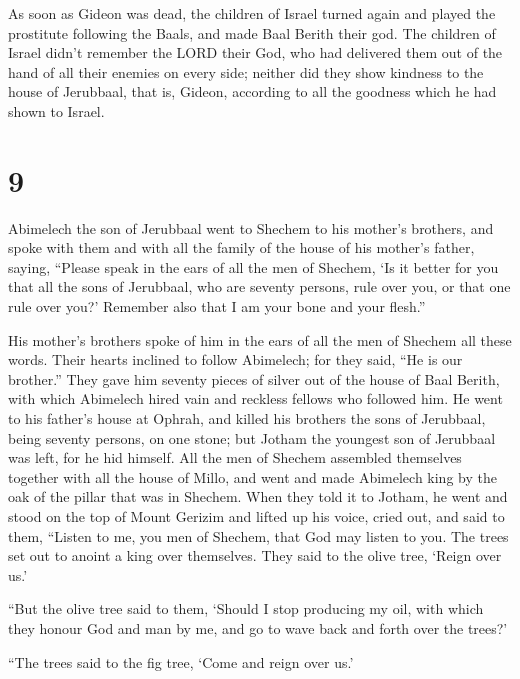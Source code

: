  As soon as Gideon was dead, the children of Israel
turned again and played the prostitute following the Baals, and made
Baal Berith their god.  The children of Israel didn't
remember the LORD their God, who had delivered them out of the hand of
all their enemies on every side;  neither did they show
kindness to the house of Jerubbaal, that is, Gideon, according to all
the goodness which he had shown to Israel.

\hypertarget{section-8}{%
\section{9}\label{section-8}}

 Abimelech the son of Jerubbaal went to Shechem to his
mother's brothers, and spoke with them and with all the family of the
house of his mother's father, saying,  ``Please speak in
the ears of all the men of Shechem, `Is it better for you that all the
sons of Jerubbaal, who are seventy persons, rule over you, or that one
rule over you?' Remember also that I am your bone and your flesh.''

 His mother's brothers spoke of him in the ears of all the
men of Shechem all these words. Their hearts inclined to follow
Abimelech; for they said, ``He is our brother.''  They
gave him seventy pieces of silver out of the house of Baal Berith, with
which Abimelech hired vain and reckless fellows who followed him.
 He went to his father's house at Ophrah, and killed his
brothers the sons of Jerubbaal, being seventy persons, on one stone; but
Jotham the youngest son of Jerubbaal was left, for he hid himself.
 All the men of Shechem assembled themselves together with
all the house of Millo, and went and made Abimelech king by the oak of
the pillar that was in Shechem.  When they told it to
Jotham, he went and stood on the top of Mount Gerizim and lifted up his
voice, cried out, and said to them, ``Listen to me, you men of Shechem,
that God may listen to you.  The trees set out to anoint a
king over themselves. They said to the olive tree, `Reign over us.'

 ``But the olive tree said to them, `Should I stop
producing my oil, with which they honour God and man by me, and go to
wave back and forth over the trees?'

 ``The trees said to the fig tree, `Come and reign over
us.'

